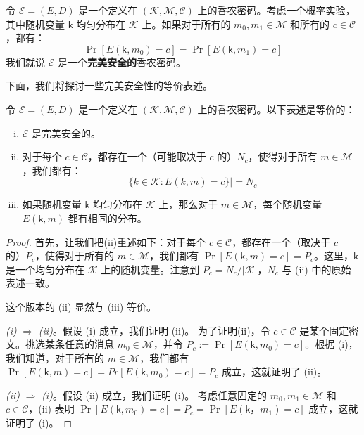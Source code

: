 \begin{definition}[完美安全性]
令 $\mathcal{E}=(E,D)$ 是一个定义在 $(\mathcal{K},\mathcal{M},\mathcal{C})$ 上的香农密码。考虑一个概率实验，其中随机变量 $\mathsf{k}$ 均匀分布在 $\mathcal{K}$ 上。如果对于所有的 $m_0,m_1\in\mathcal{M}$ 和所有的 $c\in\mathcal{C}$，都有：
\[
\Pr[E(\mathsf{k},m_0)=c]=\Pr[E(\mathsf{k},m_1)=c]
\]
我们就说 $\mathcal{E}$ 是一个\textbf{完美安全的}香农密码。
\end{definition}

下面，我们将探讨一些完美安全性的等价表述。

\begin{theorem}\label{theo:2-1}
令 $\mathcal{E}=(E,D)$ 是一个定义在 $(\mathcal{K},\mathcal{M},\mathcal{C})$ 上的香农密码。以下表述是等价的：
\begin{enumerate}[(i)]
	\item $\mathcal{E}$ 是完美安全的。
	\item 对于每个 $c\in\mathcal{C}$，都存在一个（可能取决于 $c$ 的）$N_c$，使得对于所有 $m\in\mathcal{M}$，我们都有：
	\[
    \big\lvert\{k\in\mathcal{K}:E(k,m)=c\}\big\rvert = N_c
    \]
    \item 如果随机变量 $\mathsf{k}$ 均匀分布在 $\mathcal{K}$ 上，那么对于 $m\in\mathcal{M}$，每个随机变量 $E(\mathsf{k},m)$ 都有相同的分布。
\end{enumerate}
\end{theorem}

\begin{proof}
首先，让我们把(ii)重述如下：对于每个 $c\in\mathcal{C}$，都存在一个（取决于 $c$ 的）$P_c$，使得对于所有的 $m\in\mathcal{M}$，我们都有 $\Pr[E(\mathsf{k},m)=c]=P_c$。这里，$\mathsf{k}$ 是一个均匀分布在 $\mathcal{K}$ 上的随机变量。注意到 $P_c=N_c/|\mathcal{K}|$，$N_c$ 与 (ii) 中的原始表述一致。

这个版本的 (ii) 显然与 (iii) 等价。

\vspace{5pt}

\emph{(i)} $\Longrightarrow$ \emph{(ii)}。假设 (i) 成立，我们证明 (ii)。
为了证明(ii)，令 $c\in\mathcal{C}$ 是某个固定密文。挑选某条任意的消息 $m_0\in\mathcal{M}$，并令 $P_c:=\Pr[E(\mathsf{k},m_0)=c]$。根据 (i)，我们知道，对于所有的 $m\in\mathcal{M}$，我们都有 $\Pr[E(\mathsf{k},m)=c]=Pr[E(\mathsf{k},m_0)=c]=P_c$ 成立，这就证明了 (ii)。

\emph{(ii)} $\Longrightarrow$ \emph{(i)}。假设 (ii) 成立，我们证明 (i)。
考虑任意固定的 $m_0,m_1\in\mathcal{M}$ 和 $c\in\mathcal{C}$，(ii) 表明 $\Pr[E(\mathsf{k},m_0)=c]=P_c=\Pr[E(\mathsf{k}，m_1)=c]$ 成立，这就证明了 (i)。
\end{proof}

